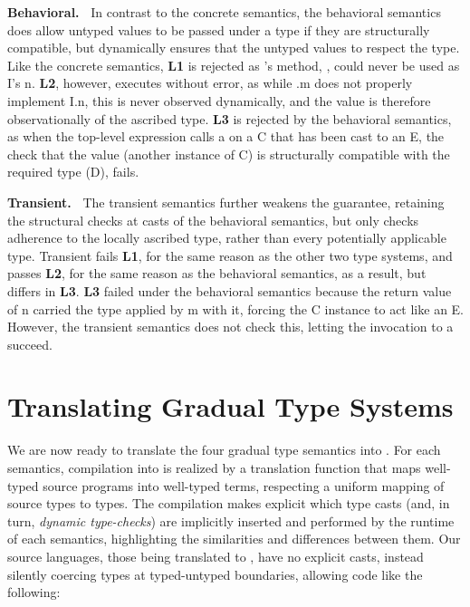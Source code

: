 \documentclass[a4paper,USenglish]{tex/lipics-v2016}
\begin{document}
{\bf Behavioral.~} In contrast to the concrete semantics, the behavioral
semantics does allow untyped values to be passed under a type if they are
structurally compatible, but dynamically ensures that the untyped values to
respect the type. Like the concrete semantics, {\bf L1} is rejected as \A's
method, \m, could never be used as \xt I's \xt n. {\bf L2}, however,
executes without error, as while \A.\xt m does not properly implement \xt
I.\xt n, this is never observed dynamically, and the value is therefore
observationally of the ascribed type. {\bf L3} is rejected by the behavioral
semantics, as when the top-level expression calls \xt a on a \xt C that has
been cast to an \xt E, the check that the value (another instance of \xt C)
is structurally compatible with the required type (\xt D), fails.

{\bf Transient.~} The transient semantics further weakens the guarantee,
retaining the structural checks at casts of the behavioral semantics, but
only checks adherence to the locally ascribed type, rather than every
potentially applicable type. Transient fails {\bf L1}, for the same reason
as the other two type systems, and passes {\bf L2}, for the same reason as
the behavioral semantics, as a result, but differs in {\bf L3}. {\bf L3}
failed under the behavioral semantics because the return value of \xt n
carried the type applied by \xt m with it, forcing the \xt C instance to act
like an \xt E.  However, the transient semantics does not check this,
letting the invocation to \xt a succeed.


\section{Translating Gradual Type Systems}


\noindent
We are now ready to translate the four gradual type semantics into \kafka.
For each semantics, compilation into \kafka is realized by a translation
function that maps well-typed source programs into well-typed \kafka terms,
respecting a uniform mapping of source types to \kafka types.  The
compilation makes explicit which type casts (and, in turn, \emph{dynamic
  type-checks}) are implicitly inserted and performed by the runtime of each
semantics, highlighting the similarities and differences between them.  Our
source languages, those being translated to \kafka, have no explicit casts,
instead silently coercing types at typed-untyped boundaries, allowing code
like the following:
\end{document}
